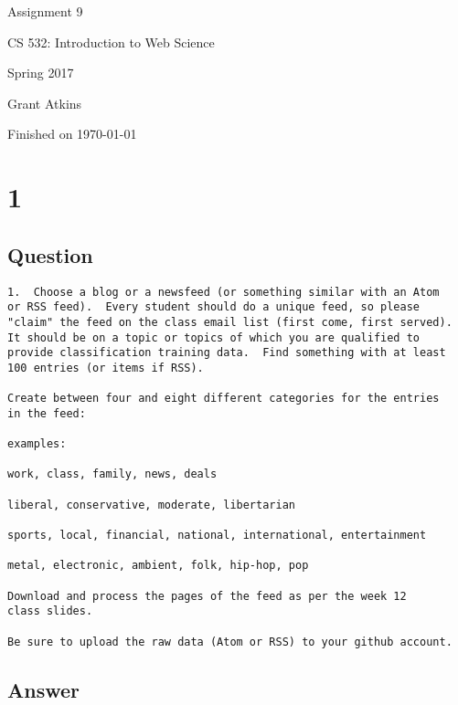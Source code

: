 \documentclass[letterpaper,11pt]{article}
\begin{document}
\begin{titlepage}

\begin{center}

\Huge{Assignment 9}

\Large{CS 532:  Introduction to Web Science}

\Large{Spring 2017}

\Large{Grant Atkins}

\Large Finished on \today

\end{center}

\end{titlepage}

\newpage


\section*{1}

\subsection*{Question}

\begin{verbatim}
1.  Choose a blog or a newsfeed (or something similar with an Atom
or RSS feed).  Every student should do a unique feed, so please
"claim" the feed on the class email list (first come, first served).
It should be on a topic or topics of which you are qualified to
provide classification training data.  Find something with at least
100 entries (or items if RSS).

Create between four and eight different categories for the entries
in the feed:

examples:

work, class, family, news, deals

liberal, conservative, moderate, libertarian

sports, local, financial, national, international, entertainment

metal, electronic, ambient, folk, hip-hop, pop

Download and process the pages of the feed as per the week 12
class slides.

Be sure to upload the raw data (Atom or RSS) to your github account.
\end{verbatim}

\clearpage
\subsection*{Answer}
\end{document}
